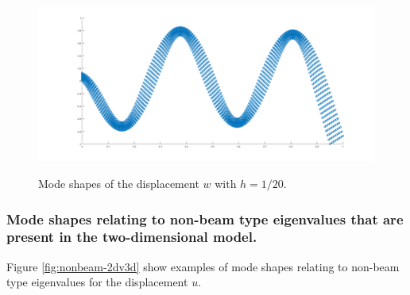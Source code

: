 \documentclass[../../main.tex]{subfiles}
\begin{document}
\begin{figure}[h!]
{{\begin{minipage}[b]{0.8\linewidth}
				\label{fig:minipage2}
			\end{minipage}
			\begin{minipage}[b]{0.8\linewidth}
				\includegraphics[width=1\linewidth]{2D6.png}
				\label{fig:minipage1}
			\end{minipage}
			\caption{Mode shapes of the displacement $w$ with $h=1/20$.}
			\label{fig:beam-2dv3d}
	}}
\end{figure}
\FloatBarrier

\subsubsection{Mode shapes relating to non-beam type eigenvalues that are present in the two-dimensional model.}
Figure \ref{fig:nonbeam-2dv3d} show examples of mode shapes relating to non-beam type eigenvalues for the displacement $u$.
\end{document}
